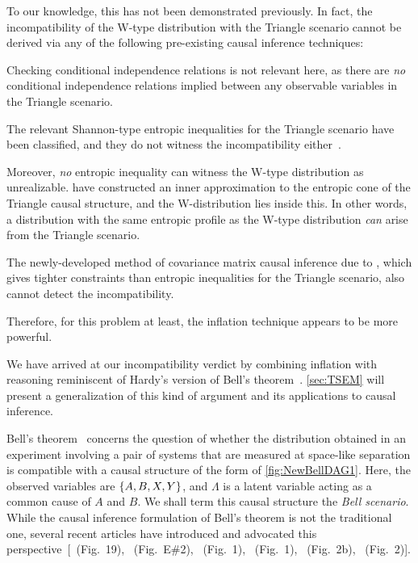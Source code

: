 To our knowledge, this has not been demonstrated previously. In fact, the incompatibility of the W-type distribution with the Triangle scenario cannot be derived via any of the following pre-existing causal inference techniques:
\begin{compactenum}
\item Checking conditional independence relations is not relevant here, as there are \emph{no} conditional independence relations implied between any observable variables in the Triangle scenario. 
\item The relevant Shannon-type entropic inequalities for the Triangle scenario have been classified, and they do not witness the incompatibility either~\cite{fritz2013marginal,chaves2014novel,chaves2014informationinference}. 
\item Moreover, \emph{no} entropic inequality can witness the W-type distribution as unrealizable. \citet{weilenmann2016entropic} have constructed an inner approximation to the entropic cone of the Triangle causal structure, and the W-distribution lies inside this. In other words, a distribution with the same entropic profile as the W-type distribution \emph{can} arise from the Triangle scenario.
\item The newly-developed method of covariance matrix causal inference due to \citet{kela2016covariance}, which gives tighter constraints than entropic inequalities for the Triangle scenario, also cannot detect the incompatibility.
\end{compactenum}
Therefore, for this problem at least, the inflation technique appears to be more powerful. 

We have arrived at our incompatibility verdict by combining inflation with reasoning reminiscent of  Hardy's version of Bell's theorem~\cite{L.Hardy:PRL:1665,Mansfield2012}. \cref{sec:TSEM} will present a generalization of this kind of argument and its applications to causal inference. 

\par\smallskip\nobreak

Bell's theorem~\cite{bell1964einstein,Brunner2013Bell,bell1966lhvm,CHSHOriginal} concerns the question of whether the distribution obtained in an experiment involving a pair of systems that are measured at space-like separation is compatible with a causal structure of the form of \cref{fig:NewBellDAG1}. Here, the observed variables are $\left\lbrace A,B,X,Y\right\rbrace$, and $\Lambda$ is a latent variable acting as a common cause of $A$ and $B$. We shall term this causal structure the \emph{Bell scenario}. While the causal inference formulation of Bell's theorem is not the traditional one, several recent articles have introduced and advocated this perspective~[\citealp{WoodSpekkens}~(Fig.~19), \citealp{pusey2014gdag}~(Fig.~E\#2), \citealp{BeyondBellII}~(Fig.~1), \citealp{chaves2014novel}~(Fig.~1), \citealp{wolfe2015nonconvexity}~(Fig.~2b), \citealp{steeg2011relaxation}~(Fig.~2)].  

